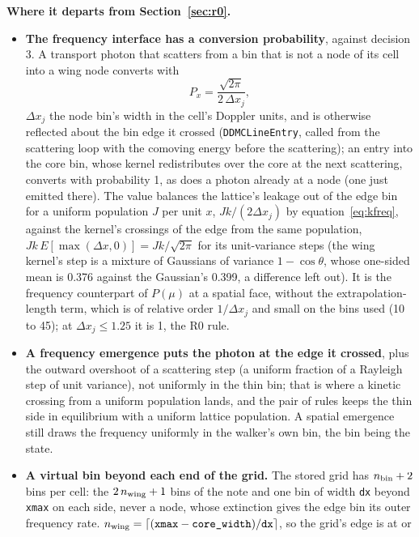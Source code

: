 \documentclass[11pt]{article}
\newcommand{\key}[1]{\texttt{#1}}
\begin{document}
\textbf{Where it departs from Section~\ref{sec:r0}.}
\begin{itemize}
\item \textbf{The frequency interface has a conversion probability}, against decision
  3.  A transport photon that scatters from a bin that is not a node of its cell into
  a wing node converts with
  \begin{equation}
  P_x = \frac{\sqrt{2\pi}}{2\,\Delta x_j},
  \label{eq:pfreq}
  \end{equation}
  $\Delta x_j$ the node bin's width in the cell's Doppler units, and is otherwise
  reflected about the bin edge it crossed (\texttt{DDMCLineEntry}, called from the
  scattering loop with the comoving energy before the scattering); an entry into the
  core bin, whose kernel redistributes over the core at the next scattering, converts
  with probability 1, as does a photon already at a node (one just emitted there).  The
  value balances the lattice's leakage out of the edge bin for a uniform population
  $J$ per unit $x$, $J k/(2\Delta x_j)$ by equation~\ref{eq:kfreq}, against the kernel's
  crossings of the edge from the same population, $J k\,E[\max(\Delta x, 0)] =
  Jk/\sqrt{2\pi}$ for its unit-variance steps (the wing kernel's step is a mixture of
  Gaussians of variance $1 - \cos\theta$, whose one-sided mean is 0.376 against the
  Gaussian's 0.399, a difference left out).  It is the frequency counterpart of
  $P(\mu)$ at a spatial face, without the extrapolation-length term, which is of
  relative order $1/\Delta x_j$ and small on the bins used (10 to 45); at $\Delta x_j
  \le 1.25$ it is 1, the R0 rule.
\item \textbf{A frequency emergence puts the photon at the edge it crossed}, plus the
  outward overshoot of a scattering step (a uniform fraction of a Rayleigh step of
  unit variance), not uniformly in the thin bin; that is where a kinetic crossing
  from a uniform population lands, and the pair of rules keeps the thin side in
  equilibrium with a uniform lattice population.  A spatial emergence still draws the
  frequency uniformly in the walker's own bin, the bin being the state.
\item \textbf{A virtual bin beyond each end of the grid.}  The stored grid has
  $n_{\rm bin} + 2$ bins per cell: the $2\,n_{\rm wing} + 1$ bins of the note and one
  bin of width \key{dx} beyond \key{xmax} on each side, never a node, whose
  extinction gives the edge bin its outer frequency rate.  $n_{\rm wing} =
  \lceil(\key{xmax} - \key{core\_width})/\key{dx}\rceil$, so the grid's edge is at or

\end{itemize}
\end{document}
